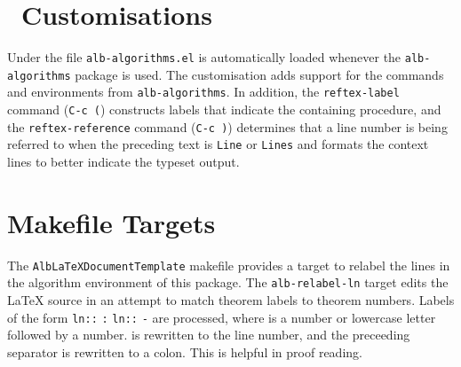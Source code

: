 \documentclass[11pt,a4paper,oneside,titlepage]{alb-latex}
\begin{document}

\section{\AUCTeX\ Customisations}
\label{sec:alb-algorithms-documentation:auctex-cust}

Under \AUCTeX{} the file \texttt{alb-algorithms.el} is automatically
loaded whenever the \texttt{alb-algorithms} package is used.  The
customisation adds support for the commands and environments from
\texttt{alb-algorithms}.  In addition, the \texttt{reftex-label} command
(\texttt{C-c (}) constructs labels that indicate the containing
procedure, and the \texttt{reftex-reference} command (\texttt{C-c )})
determines that a line number is being referred to when the preceding
text is \texttt{Line} or \texttt{Lines} and formats the context lines to
better indicate the typeset output.




\section{Makefile Targets}
\label{sec:alb-algorithms-documentation:makef-targ}

The \texttt{AlbLaTeXDocumentTemplate} makefile provides a target to
relabel the lines in the algorithm environment of this package.  The
\texttt{alb-relabel-ln} target edits the \LaTeX{} source in an attempt
to match theorem labels to theorem numbers.  Labels of the form
\texttt{ln:}\texttt{:}%
\texttt{:}
\texttt{ln:}\texttt{:}%
\texttt{-} are processed, where  is a
number or lowercase letter followed by a number.   is
rewritten to the line number, and the preceeding separator is rewritten
to a colon.  This is helpful in proof reading.
\end{document}
